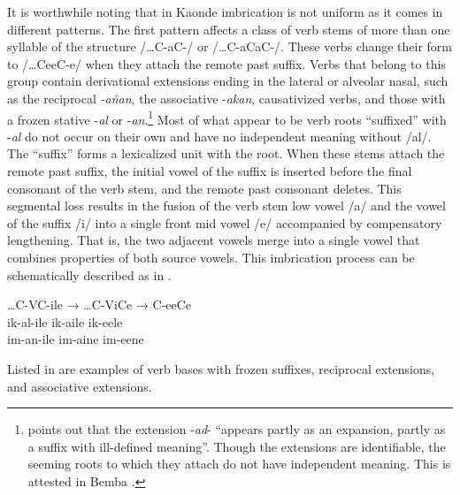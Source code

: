 \documentclass[output=paper]{langsci/langscibook}
\begin{document}
It is worthwhile noting that in Kaonde imbrication is not uniform as it comes in different patterns. The first pattern affects a class of verb stems of more than one syllable of the structure /…C-aC-/ or /…C-aCaC-/. These verbs change their form to /…CeeC-e/ when they attach the remote past suffix. Verbs that belong to this group contain derivational extensions ending in the lateral or alveolar nasal, such as the reciprocal \textit{-añan}, the associative -\textit{akan}, causativized verbs, and those with a frozen stative -\textit{al} or -\textit{an}.\footnote{\citet[90]{meeussen1967} points out that the extension -\textit{ad}- “appears partly as an expansion, partly as a suffix with ill-defined meaning”. Though the extensions are identifiable, the seeming roots to which they attach do not have independent meaning. This is attested in Bemba \citep{hyman1995}.} Most of what appear to be verb roots “suffixed” with -\textit{al} do not occur on their own and have no independent meaning without /al/. The “suffix” forms a lexicalized unit with the root. When these stems attach the remote past suffix, the initial vowel of the suffix is inserted before the final consonant of the verb stem, and the remote past consonant deletes. This segmental loss results in the fusion of the verb stem low vowel /a/ and the vowel of the suffix /i/ into a single front mid vowel /e/ accompanied by compensatory lengthening. That is, the two adjacent vowels merge into a single vowel that combines properties of both source vowels. This imbrication process can be schematically described as in .

\ea
\label{ex:5.kawasha}
 \glll …C-VC-ile  →  …C-ViCe  →  C-eeCe  \\
  ik-al-ile {}   ik-aile  {}  ik-eele\\
 im-an-ile  {}  im-aine  {}  im-eene\\

\z

Listed in  are examples of verb bases with frozen suffixes, reciprocal extensions, and associative extensions.
\end{document}
